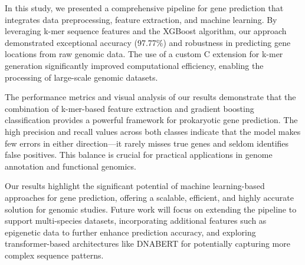 \documentclass[
	a4paper, %
	10pt, %
	unnumberedsections, %
	twoside, %
]{LTJournalArticle}
\begin{document}
In this study, we presented a comprehensive pipeline for gene prediction that integrates data preprocessing, feature extraction, and machine learning. By leveraging k-mer sequence features and the XGBoost algorithm, our approach demonstrated exceptional accuracy (97.77\%) and robustness in predicting gene locations from raw genomic data. The use of a custom C extension for k-mer generation significantly improved computational efficiency, enabling the processing of large-scale genomic datasets.

The performance metrics and visual analysis of our results demonstrate that the combination of k-mer-based feature extraction and gradient boosting classification provides a powerful framework for prokaryotic gene prediction. The high precision and recall values across both classes indicate that the model makes few errors in either direction—it rarely misses true genes and seldom identifies false positives. This balance is crucial for practical applications in genome annotation and functional genomics.

Our results highlight the significant potential of machine learning-based approaches for gene prediction, offering a scalable, efficient, and highly accurate solution for genomic studies. Future work will focus on extending the pipeline to support multi-species datasets, incorporating additional features such as epigenetic data to further enhance prediction accuracy, and exploring transformer-based architectures like DNABERT \cite{Ji:2021, Vaswani:2017, Devlin:2019} for potentially capturing more complex sequence patterns.



\printbibliography %
\end{document}
